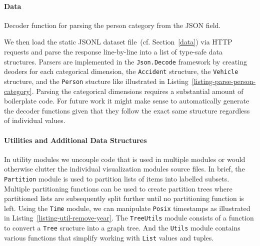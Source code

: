 \paragraph{Data}
\begin{listing}
    
    \caption{Decoder function for parsing the person category from the JSON field.}
    \label{listing-parse-person-category}
\end{listing}
We then load the static JSONL dataset file~(cf. Section~\ref{data}) via HTTP requests and parse the response line-by-line into a list of type-safe data structures. Parsers are implemented in the \lstinline{Json.Decode} framework by creating deoders for each categorical dimension, the \lstinline{Accident} structure, the \lstinline{Vehicle} structure, and the \lstinline{Person} stucture like illustrated in Listing~\ref{listing-parse-person-category}.
Parsing the categorical dimensions requires a substantial amount of boilerplate code. For future work it might make sense to automatically generate the decoder functions given that they follow the exact same structure regardless of individual values.

\paragraph{Utilities and Additional Data Structures}
\begin{listing}
    
    \caption{Helper function for stripping the year field represented in a \lstinline{Posix} timestamp.}
    \label{listing-util-remove-year}
\end{listing}
In utility modules we uncouple code that is used in multiple modules or would otherwise clutter the individual visualization modules source files.
In brief, the \lstinline{Partition} module is used to partition lists of items into labelled subsets. Multiple partitioning functions can be used to create partition trees where partitioned lists are subsequently split further until no partitioning function is left.
Using the \lstinline{Time} module, we can manipulate \lstinline{Posix} timestamps as illustrated in Listing~\ref{listing-util-remove-year}.
The \lstinline{TreeUtils} module consists of a function to convert a \lstinline{Tree} sructure into a graph tree.
And the \lstinline{Utils} module contains various functions that simplify working with \lstinline{List} values and tuples.

